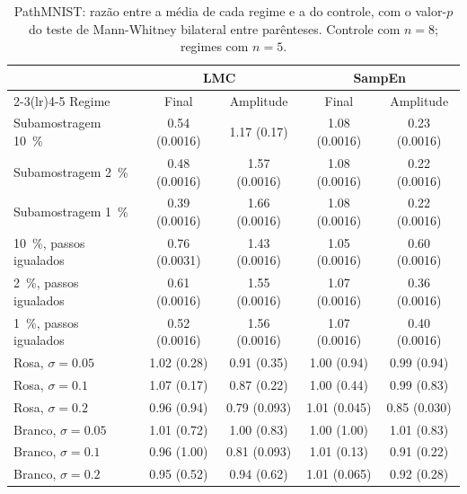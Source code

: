 \begin{table}[H]
  \centering
  \caption{PathMNIST: razão entre a média de cada regime e a do controle, com o
  valor-$p$ do teste de Mann-Whitney bilateral entre parênteses. Controle com
  $n = 8$; regimes com $n = 5$.}
  \label{tab:comp-pathmnist}
  \footnotesize
  \begin{tabular}{lcccc}
    \toprule
    & \multicolumn{2}{c}{LMC} & \multicolumn{2}{c}{SampEn} \\
    \cmidrule(lr){2-3}\cmidrule(lr){4-5}
    Regime & Final & Amplitude & Final & Amplitude \\
    \midrule
    Subamostragem \SI{10}{\percent} & \num{0,54} (\num{0,0016}) & \num{1,17} (\num{0,17}) & \num{1,08} (\num{0,0016}) & \num{0,23} (\num{0,0016}) \\
    Subamostragem \SI{2}{\percent}  & \num{0,48} (\num{0,0016}) & \num{1,57} (\num{0,0016}) & \num{1,08} (\num{0,0016}) & \num{0,22} (\num{0,0016}) \\
    Subamostragem \SI{1}{\percent}  & \num{0,39} (\num{0,0016}) & \num{1,66} (\num{0,0016}) & \num{1,08} (\num{0,0016}) & \num{0,22} (\num{0,0016}) \\
    \midrule
    \SI{10}{\percent}, passos igualados & \num{0,76} (\num{0,0031}) & \num{1,43} (\num{0,0016}) & \num{1,05} (\num{0,0016}) & \num{0,60} (\num{0,0016}) \\
    \SI{2}{\percent}, passos igualados  & \num{0,61} (\num{0,0016}) & \num{1,55} (\num{0,0016}) & \num{1,07} (\num{0,0016}) & \num{0,36} (\num{0,0016}) \\
    \SI{1}{\percent}, passos igualados  & \num{0,52} (\num{0,0016}) & \num{1,56} (\num{0,0016}) & \num{1,07} (\num{0,0016}) & \num{0,40} (\num{0,0016}) \\
    \midrule
    Rosa, $\sigma = \num{0,05}$   & \num{1,02} (\num{0,28}) & \num{0,91} (\num{0,35}) & \num{1,00} (\num{0,94}) & \num{0,99} (\num{0,94}) \\
    Rosa, $\sigma = \num{0,1}$    & \num{1,07} (\num{0,17}) & \num{0,87} (\num{0,22}) & \num{1,00} (\num{0,44}) & \num{0,99} (\num{0,83}) \\
    Rosa, $\sigma = \num{0,2}$    & \num{0,96} (\num{0,94}) & \num{0,79} (\num{0,093}) & \num{1,01} (\num{0,045}) & \num{0,85} (\num{0,030}) \\
    Branco, $\sigma = \num{0,05}$ & \num{1,01} (\num{0,72}) & \num{1,00} (\num{0,83}) & \num{1,00} (\num{1,00}) & \num{1,01} (\num{0,83}) \\
    Branco, $\sigma = \num{0,1}$  & \num{0,96} (\num{1,00}) & \num{0,81} (\num{0,093}) & \num{1,01} (\num{0,13}) & \num{0,91} (\num{0,22}) \\
    Branco, $\sigma = \num{0,2}$  & \num{0,95} (\num{0,52}) & \num{0,94} (\num{0,62}) & \num{1,01} (\num{0,065}) & \num{0,92} (\num{0,28}) \\
    \bottomrule
  \end{tabular}
\end{table}

